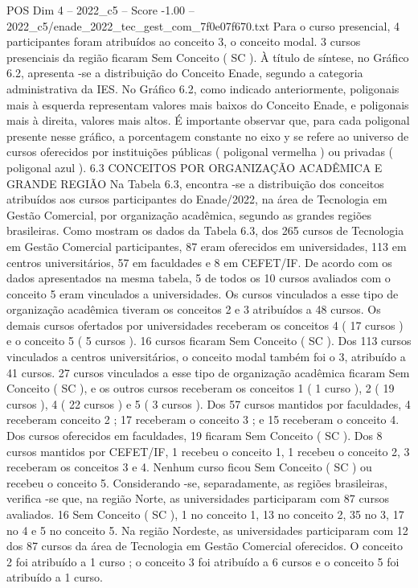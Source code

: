 \begin{textsample}{POS Dim 4 – 2022\_c5 – Score -1.00 – 2022\_c5/enade\_2022\_tec\_gest\_com\_7f0e07f670.txt}
Para o curso presencial, 4 participantes foram atribuídos ao conceito 3, o conceito modal. 3 cursos presenciais da região ficaram Sem Conceito ( SC ).
À título de síntese, no Gráfico 6.2, apresenta -se a distribuição do Conceito Enade, segundo a categoria administrativa da IES.
No Gráfico 6.2, como indicado anteriormente, poligonais mais à esquerda representam valores mais baixos do Conceito Enade, e poligonais mais à direita, valores mais altos.
É importante observar que, para cada poligonal presente nesse gráfico, a porcentagem constante no eixo y se refere ao universo de cursos oferecidos por instituições públicas ( poligonal vermelha ) ou privadas ( poligonal azul ). 6.3 CONCEITOS POR ORGANIZAÇÃO ACADÊMICA E GRANDE REGIÃO Na Tabela 6.3, encontra -se a distribuição dos conceitos atribuídos aos cursos participantes do Enade/2022, na área de Tecnologia em Gestão Comercial, por organização acadêmica, segundo as grandes regiões brasileiras.
Como mostram os dados da Tabela 6.3, dos 265 cursos de Tecnologia em Gestão Comercial participantes, 87 eram oferecidos em universidades, 113 em centros universitários, 57 em faculdades e 8 em CEFET/IF.
De acordo com os dados apresentados na mesma tabela, 5 de todos os 10 cursos avaliados com o conceito 5 eram vinculados a universidades.
Os cursos vinculados a esse tipo de organização acadêmica tiveram os conceitos 2 e 3 atribuídos a 48 cursos.
Os demais cursos ofertados por universidades receberam os conceitos 4 ( 17 cursos ) e o conceito 5 ( 5 cursos ). 16 cursos ficaram Sem Conceito ( SC ).
Dos 113 cursos vinculados a centros universitários, o conceito modal também foi o 3, atribuído a 41 cursos. 27 cursos vinculados a esse tipo de organização acadêmica ficaram Sem Conceito ( SC ), e os outros cursos receberam os conceitos 1 ( 1 curso ), 2 ( 19 cursos ), 4 ( 22 cursos ) e 5 ( 3 cursos ).
Dos 57 cursos mantidos por faculdades, 4 receberam conceito 2 ; 17 receberam o conceito 3 ; e 15 receberam o conceito 4.
Dos cursos oferecidos em faculdades, 19 ficaram Sem Conceito ( SC ).
Dos 8 cursos mantidos por CEFET/IF, 1 recebeu o conceito 1, 1 recebeu o conceito 2, 3 receberam os conceitos 3 e 4.
Nenhum curso ficou Sem Conceito ( SC ) ou recebeu o conceito 5.
Considerando -se, separadamente, as regiões brasileiras, verifica -se que, na região Norte, as universidades participaram com 87 cursos avaliados. 16 Sem Conceito ( SC ), 1 no conceito 1, 13 no conceito 2, 35 no 3, 17 no 4 e 5 no conceito 5.
Na região Nordeste, as universidades participaram com 12 dos 87 cursos da área de Tecnologia em Gestão Comercial oferecidos.
O conceito 2 foi atribuído a 1 curso ; o conceito 3 foi atribuído a 6 cursos e o conceito 5 foi atribuído a 1 curso.

\end{textsample}
